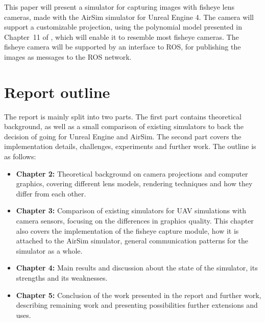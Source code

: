 This paper will present a simulator for capturing images with fisheye lens cameras, made with the AirSim simulator for Unreal Engine 4. The camera will support a customizable projection, using the polynomial model presented in Chapter~11 of \cite{FisheyeCorke}, which will enable it to resemble most fisheye cameras. The fisheye camera will be supported by an interface to ROS, for publishing the images as messages to the ROS network.

\section{Report outline}

The report is mainly split into two parts. The first part contains theoretical background, as well as a small comparison of existing simulators to back the decision of going for Unreal Engine and AirSim. The second part covers the implementation details, challenges, experiments and further work. The outline is as follows:

\begin{itemize}
    \item \textbf{Chapter 2:} Theoretical background on camera projections and computer graphics, covering different lens models, rendering techniques and how they differ from each other.
    \item \textbf{Chapter 3:} Comparison of existing simulators for UAV simulations with camera sensors, focusing on the differences in graphics quality. This chapter also covers the implementation of the fisheye capture module, how it is attached to the AirSim simulator, general communication patterns for the simulator as a whole.
    \item \textbf{Chapter 4:} Main results and discussion about the state of the simulator, its strengths and its weaknesses.
    \item \textbf{Chapter 5:} Conclusion of the work presented in the report and further work, describing remaining work and presenting possibilities further extensions and uses.
\end{itemize}

